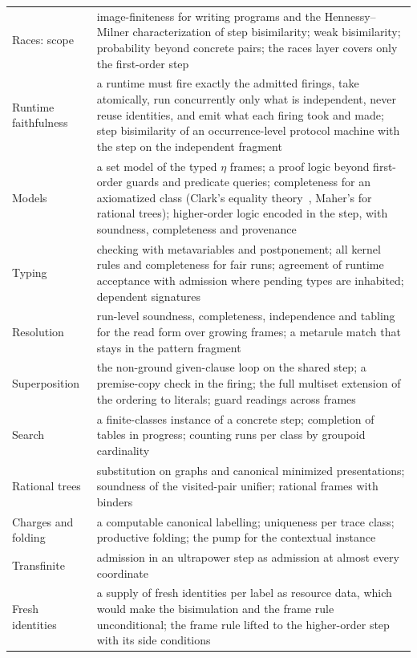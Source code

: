 \documentclass[11pt]{article}
\theoremstyle{remark}
\begin{document}
{\begin{longtable}{@{}L{0.30\textwidth}L{0.65\textwidth}@{}}
Races: scope & image-finiteness for writing programs and the Hennessy--Milner characterization of step bisimilarity; weak bisimilarity; probability beyond concrete pairs; the races layer covers only the first-order step \\
Runtime faithfulness & a runtime must fire exactly the admitted firings, take atomically, run concurrently only what is independent, never reuse identities, and emit what each firing took and made; step bisimilarity of an occurrence-level protocol machine with the step on the independent fragment \\
Models & a set model of the typed $\eta$ frames; a proof logic beyond first-order guards and predicate queries; completeness for an axiomatized class (Clark's equality theory~\cite{clark78}, Maher's for rational trees); higher-order logic encoded in the step, with soundness, completeness and provenance \\
Typing & checking with metavariables and postponement; all kernel rules and completeness for fair runs; agreement of runtime acceptance with admission where pending types are inhabited; dependent signatures \\
Resolution & run-level soundness, completeness, independence and tabling for the read form over growing frames; a metarule match that stays in the pattern fragment \\
Superposition & the non-ground given-clause loop on the shared step; a premise-copy check in the firing; the full multiset extension of the ordering to literals; guard readings across frames \\
Search & a finite-classes instance of a concrete step; completion of tables in progress; counting runs per class by groupoid cardinality \\
Rational trees & substitution on graphs and canonical minimized presentations; soundness of the visited-pair unifier; rational frames with binders \\
Charges and folding & a computable canonical labelling; uniqueness per trace class; productive folding; the pump for the contextual instance \\
Transfinite & admission in an ultrapower step as admission at almost every coordinate \\
Fresh identities & a supply of fresh identities per label as resource data, which would make the bisimulation and the frame rule unconditional; the frame rule lifted to the higher-order step with its side conditions \\
\bottomrule
\end{longtable}
}
\end{document}
